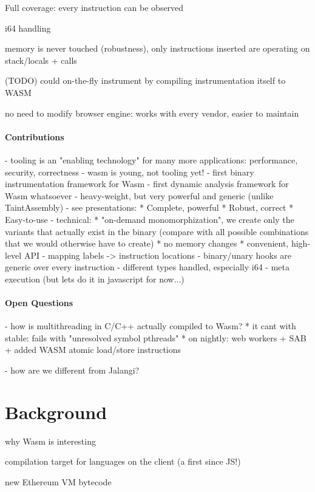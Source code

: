 \documentclass[sigplan,review,anonymous]{acmart}\settopmatter{printfolios=true,printccs=false,printacmref=false}
\begin{document}
Full coverage: every instruction can be observed

i64 handling

memory is never touched (\textrightarrow robustness), only instructions inserted are operating on stack/locals + calls

(TODO) could on-the-fly instrument by compiling instrumentation itself to WASM

no need to modify browser engine: works with every vendor, easier to maintain

\paragraph{Contributions}

- tooling is an "enabling technology" for many more applications: performance, security, correctness
- wasm is young, not tooling yet!
- first binary instrumentation framework for Wasm
- first dynamic analysis framework for Wasm whatsoever
- heavy-weight, but very powerful and generic (unlike TaintAssembly)
- see presentations:
	* Complete, powerful
	* Robust, correct
	* Easy-to-use
- technical: 
	* "on-demand monomorphization", we create only the variants that actually exist in the binary (compare with all possible combinations that we would otherwise have to create)
	* no memory changes
	* convenient, high-level API
		- mapping labels -> instruction locations
		- binary/unary hooks are generic over every instruction
		- different types handled, especially i64
- meta execution (but lets do it in javascript for now...)
		
\paragraph{Open Questions}
- how is multithreading in C/C++ actually compiled to Wasm?
	* it cant with stable: fails with "unresolved symbol pthreads"
	* on nightly: web workers + SAB + added WASM atomic load/store instructions

- how are we different from Jalangi?

\newpage
\section{Background}

why Wasm is interesting

compilation target for languages on the client (a first since JS!)

new Ethereum VM bytecode
\end{document}
